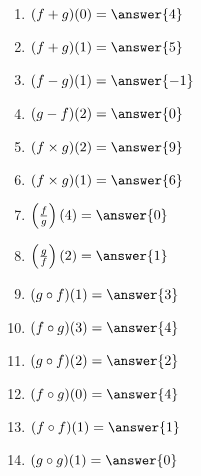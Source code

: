 \documentclass{ximera}
\begin{document}
\begin{exercise}
\begin{enumerate}
\item  $(f+g)(0)=\answer{4}$ \label{twofuncgraphsfirst}
\item  $(f+g)(1)=\answer{5}$
\item  $(f-g)(1)=\answer{-1}$
\item  $(g-f)(2)=\answer{0}$
\item  $(f\times g)(2)=\answer{9}$
\item  $(f\times g)(1)=\answer{6}$
\item  $\left(\frac{f}{g}\right)(4)=\answer{0}$
\item  $\left(\frac{g}{f}\right)(2)=\answer{1}$ \label{twofuncgraphslast}
\item  $(g\circ f)(1)=\answer{3}$  \label{twofuncgraphcompfirst}
\item  $(f \circ g)(3)=\answer{4}$
\item  $(g\circ f)(2)=\answer{2}$
\item  $(f\circ g)(0)=\answer{4}$  
\item  $(f\circ f)(1)=\answer{1}$
\item  $(g \circ g)(1)=\answer{0}$
\end{enumerate}

\end{exercise}
\end{document}
